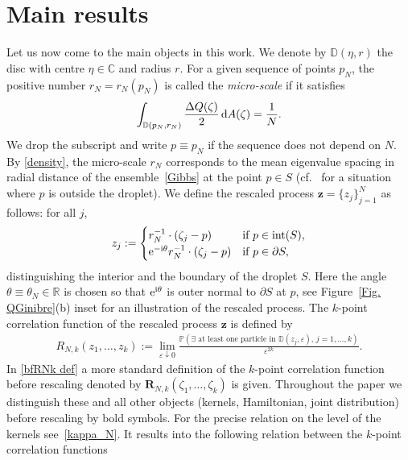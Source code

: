 \documentclass[pdftex]{sigma}
\numberwithin{equation}{section}
\newcommand{\bfR}{\mathbf{R}}
\newcommand{\R}{{\mathbb R}}
\newcommand{\C}{{\mathbb C}}
\newcommand{\eps}{{\varepsilon}}
\newcommand{\1}{\chi}
\begin{document}
\section{Main results}\label{sec:main}
Let us now come to the main objects in this work. We denote by $\mathbb{D}(\eta,r)$ the disc with centre $\eta \in \C$ and radius $r$. For a given sequence of points $p_N$, the positive number $r_N=r_N(p_N)$ is called the \textit{micro-scale} if it satisfies
\begin{gather} \label{micro-scale}
	\int_{ \mathbb{D}(p_N,r_N) } \frac{ \Delta Q(\zeta) }{2} \,{\rm d}A(\zeta)= \frac{1}{N}.
\end{gather}
We drop the subscript and write $p \equiv p_N$ if the sequence does not depend on $N$.
By \eqref{density}, the micro-scale $r_N$ corresponds to the mean eigenvalue spacing in radial distance of the ensemble~\eqref{Gibbs} at the point $p\in S$
(cf.~\cite{BE} for a situation where $p$ is outside the droplet).
We define the rescaled process $\boldsymbol{z}=\{ z_j \}_{ j=1 }^N$ as follows: for all $j$,
\begin{gather} \label{rescaling}
	z_j:=
	\begin{cases}
		r_N^{-1} \cdot (\zeta_j-p) &\text{if } p \in \operatorname{int}(S) ,
		\\
		{\rm e}^{-{\rm i}\theta} r_N^{-1} \cdot (\zeta_j-p) &\text{if } p \in \partial S ,
	\end{cases}
\end{gather}
distinguishing the interior and the boundary of the droplet $S$.
Here the angle $\theta\equiv \theta_N \in \R$ is chosen so that ${\rm e}^{{\rm i}\theta}$ is outer normal to $\partial S$ at $p$, see Figure~\ref{Fig. QGinibre}(b)
inset
for an illustration of the rescaled process.
The $k$-point correlation function of
the rescaled process $\boldsymbol{z}$ is defined by
\begin{gather*}
R_{N,k}(z_1,\dots,z_k)
:= \lim_{\eps \downarrow 0} \frac{\mathbb{P}(\exists \text{ at least one particle in } \mathbb{D}(z_j,\eps),\, j=1,\dots,k ) }{\eps^{2k}}.
\end{gather*}
In \eqref{bfRNk def} a more standard definition of the $k$-point correlation function before rescaling denoted by $\bfR_{N,k}(\zeta_1,\dots,\zeta_k)$ is given.
Throughout the paper we distinguish these and all other objects (kernels, Hamiltonian, joint distribution) before rescaling by bold symbols.
For the precise relation on the level of the kernels see~\eqref{kappa_N}. It results into the following relation between the $k$-point correlation functions
\end{document}
